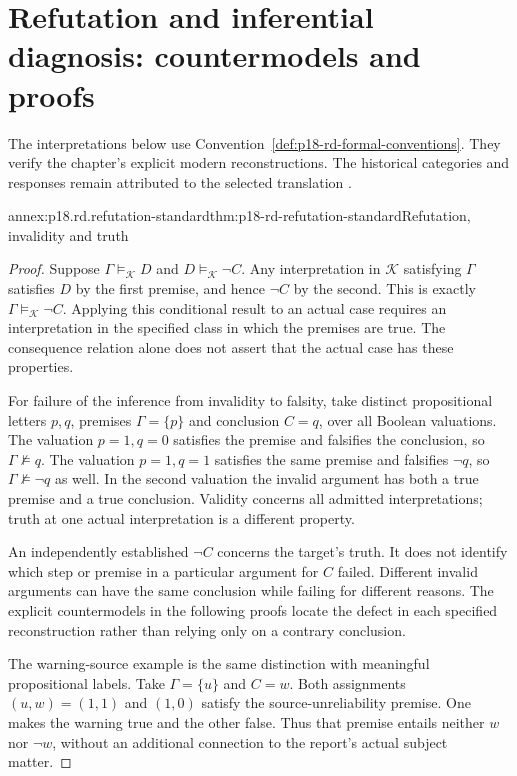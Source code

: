 \section{Refutation and inferential diagnosis: countermodels and proofs}
\label{sec:annex-p18-refutation-diagnosis}

The interpretations below use
Convention~\ref{def:p18-rd-formal-conventions}. They verify the
chapter's explicit modern reconstructions. The historical categories
and responses remain attributed to the selected translation
\cite{AristotleSophisticalRefutationsPickardCambridgeMIT}.

\begin{annexitem}{annex:p18.rd.refutation-standard}{thm:p18-rd-refutation-standard}{Refutation, invalidity and truth}
\begin{proof}
Suppose \(\Gamma\models_{\mathcal K}D\) and
\(D\models_{\mathcal K}\neg C\). Any interpretation in
\(\mathcal K\) satisfying \(\Gamma\) satisfies \(D\) by
the first premise, and hence \(\neg C\) by the second. This is
exactly \(\Gamma\models_{\mathcal K}\neg C\). Applying this
conditional result to an actual case requires an interpretation in
the specified class in which the premises are true. The consequence
relation alone does not assert that the actual case has these properties.

For failure of the inference from invalidity to falsity, take distinct
propositional letters \(p,q\), premises \(\Gamma=\{p\}\)
and conclusion \(C=q\), over all Boolean valuations. The valuation
\(p=1,q=0\) satisfies the premise and falsifies the conclusion, so
\(\Gamma\not\models q\). The valuation \(p=1,q=1\) satisfies
the same premise and falsifies \(\neg q\), so
\(\Gamma\not\models\neg q\) as well. In the second valuation
the invalid argument has both a true premise and a true conclusion.
Validity concerns all admitted interpretations; truth at one actual
interpretation is a different property.

An independently established \(\neg C\) concerns the target's
truth. It does not identify which step or premise in a particular
argument for \(C\) failed. Different invalid arguments can have
the same conclusion while failing for different reasons. The explicit
countermodels in the following proofs locate the defect in each
specified reconstruction rather than relying only on a contrary
conclusion.

The warning-source example is the same distinction with meaningful
propositional labels. Take \(\Gamma=\{u\}\) and \(C=w\).
Both assignments \((u,w)=(1,1)\) and \((1,0)\) satisfy the
source-unreliability premise. One makes the warning true and the
other false. Thus that premise entails neither \(w\) nor
\(\neg w\), without an additional connection to the report's
actual subject matter.
\end{proof}
\end{annexitem}

